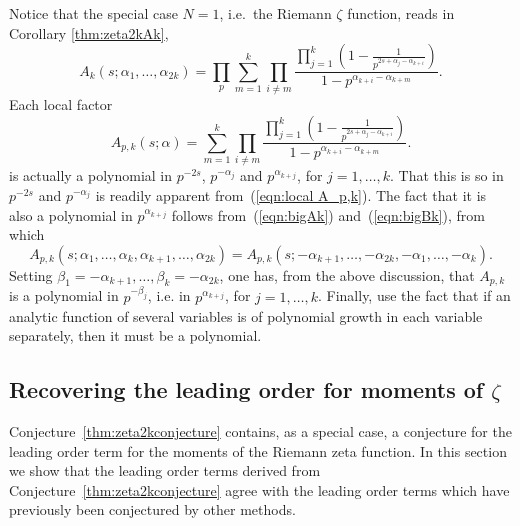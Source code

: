 \documentclass[12pt,letterpaper]{amsart}
\theoremstyle{plain}
\theoremstyle{definition}
\theoremstyle{remark}
\numberwithin{equation}{subsection}
\numberwithin{theorem}{subsection}
\numberwithin{table}{subsection}
\def\({\left(}
\def\){\right)}
\begin{document}
Notice that the special case $N=1$, i.e.~the Riemann $\zeta$ function,
reads in Corollary \ref{thm:zeta2kAk}, 
\begin{equation}
A_k(s;\alpha_1,\dots,\alpha_{2k})=  
 \prod_{p} 
\sum_{m=1}^k
    \prod_{i\neq m}
       \frac{\displaystyle \prod_{j=1}^k \(1-\frac{1}{p^{2s+\alpha_j-\alpha_{k+i}}}\)}
                         {1-p^{\alpha_{k+i}-\alpha_{k+m}}}.
\end{equation}
Each local factor
\begin{equation}
\label{eqn:local A_p,k}
A_{p,k}(s;\alpha)=  
\sum_{m=1}^k
    \prod_{i\neq m}
       \frac{\displaystyle \prod_{j=1}^k \(1-\frac{1}{p^{2s+\alpha_j-\alpha_{k+i}}}\)}
                         {1-p^{\alpha_{k+i}-\alpha_{k+m}}}.
\end{equation}
is actually a polynomial in $p^{-2s}$, $p^{-\alpha_j}$ and $p^{\alpha_{k+j}}$, for $j=1,\dots,k$.
That this is so in $p^{-2s}$ and $p^{-\alpha_j}$ is readily apparent from~(\ref{eqn:local A_p,k}).
The fact that it is also a polynomial in $p^{\alpha_{k+j}}$ follows from~(\ref{eqn:bigAk}) 
and~(\ref{eqn:bigBk}), from which
\begin{equation}
    A_{p,k}(s;\alpha_1,\dots,\alpha_k,\alpha_{k+1},\dots,\alpha_{2k})= 
    A_{p,k}(s;-\alpha_{k+1},\dots,-\alpha_{2k},-\alpha_{1},\dots,-\alpha_{k}) .
\end{equation}
Setting $\beta_1=-\alpha_{k+1},\dots,\beta_k=-\alpha_{2k}$, one has,
from the above discussion, that $A_{p,k}$ is a polynomial in
$p^{-\beta_j}$, i.e. in $p^{\alpha_{k+j}}$, for $j=1,\dots,k$.
Finally, use the fact that if an analytic function of several variables is
of polynomial growth in each variable separately, then it must
be a polynomial.



\subsection{  Recovering the leading order for moments of $\zeta$
}\label{sec:leadingorder}
Conjecture~\ref{thm:zeta2kconjecture} contains, as a special case,
 a conjecture for
the leading order term for the moments of the Riemann zeta function.
In this section we show that the leading order terms derived from
Conjecture~\ref{thm:zeta2kconjecture} agree with the 
leading order terms which have previously been conjectured by other methods.
\end{document}
